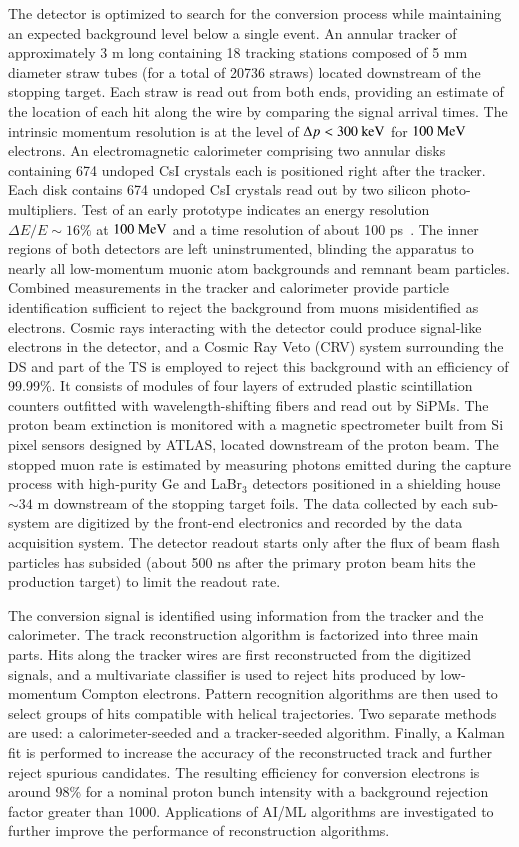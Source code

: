 The detector is optimized to search for the conversion process while maintaining an expected background level below a single event. An annular tracker of approximately 3 m long containing 18 tracking stations composed of 5 mm diameter straw tubes (for a total of 20736 straws) located downstream of the stopping target. Each straw is read out from both ends, providing an estimate of the location of each hit along the wire by comparing the signal arrival times. The intrinsic momentum resolution is at the level of $\Delta p < 300 ~\mbox{keV}$ for $100 ~\mbox{MeV}$ electrons. An electromagnetic calorimeter comprising two annular disks containing 674 undoped CsI crystals each is positioned right after the tracker. Each disk contains 674 undoped CsI crystals read out by two silicon photo-multipliers. Test of an early prototype indicates an energy resolution $\Delta E/E \sim 16\%$ at $100 ~\mbox{MeV}$ and a time resolution of about 100 ps~\cite{Atanova:2017ppl}. The inner regions of both detectors are left uninstrumented, blinding the apparatus to nearly all low-momentum muonic atom backgrounds and remnant beam particles. Combined measurements in the tracker and calorimeter provide particle identification sufficient to reject the background from muons misidentified as electrons. Cosmic rays interacting with the detector could produce signal-like electrons in the detector, and a Cosmic Ray Veto (CRV) system surrounding the DS and part of the TS is employed to reject this background with an efficiency of 99.99\%. It consists of modules of four layers of extruded plastic scintillation counters outfitted with wavelength-shifting fibers and read out by SiPMs. The proton beam extinction is monitored with a magnetic spectrometer built from Si pixel sensors designed by ATLAS, located downstream of the proton beam. The stopped muon rate is estimated by measuring photons emitted during the capture process with high-purity Ge and LaBr$_3$ detectors positioned in a shielding house $\sim 34$ m downstream of the stopping target foils. The data collected by each sub-system are digitized by the front-end electronics and recorded by the data acquisition system. The detector readout starts only after the flux of beam flash particles has subsided (about 500 ns after the primary proton beam hits the production target) to limit the readout rate. 

The conversion signal is identified using information from the tracker and the calorimeter. The track reconstruction algorithm is factorized into three main parts. Hits along the tracker wires are first reconstructed from the digitized signals, and a multivariate classifier is used to reject hits produced by low-momentum Compton electrons. Pattern recognition algorithms are then used to select groups of hits compatible with helical trajectories. Two separate methods are used: a calorimeter-seeded and a tracker-seeded algorithm. Finally, a Kalman fit is performed to increase the accuracy of the reconstructed track and further reject spurious candidates. The resulting efficiency for conversion electrons is around 98\% for a nominal proton bunch intensity with a background rejection factor greater than 1000. Applications of AI/ML algorithms are investigated to further improve the performance of reconstruction algorithms.

